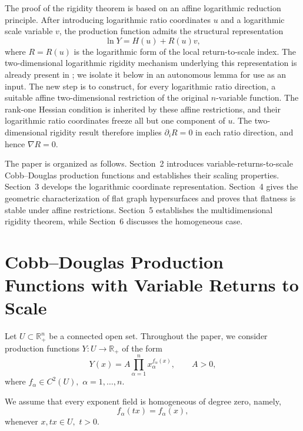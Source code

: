 \documentclass[12pt]{amsart}
\begin{document}
The proof of the rigidity theorem is based on an affine logarithmic reduction principle. After
introducing logarithmic ratio coordinates \(u\) and a logarithmic scale
variable \(v\), the production function admits the structural
representation
\[
\ln Y=H(u)+R(u)v,
\]
where \(R=R(u)\) is the logarithmic form of the local return-to-scale
index. The two-dimensional logarithmic rigidity mechanism underlying this
representation is already present in \cite{Previous2D}; we isolate it below
in an autonomous lemma for use as an input. The new step is to construct,
for every logarithmic ratio direction, a suitable affine two-dimensional
restriction of the original \(n\)-variable function. The rank-one Hessian
condition is inherited by these affine restrictions, and their logarithmic
ratio coordinates freeze all but one component of \(u\). The two-dimensional
rigidity result therefore implies \(\partial_iR=0\) in each ratio direction,
and hence \(\nabla R=0\).

The paper is organized as follows. Section~2 introduces
variable-returns-to-scale Cobb--Douglas production functions and
establishes their scaling properties. Section~3 develops the logarithmic
coordinate representation. Section~4 gives the geometric
characterization of flat graph hypersurfaces and proves that flatness is stable under affine restrictions. Section~5 establishes the multidimensional
rigidity theorem, while Section~6 discusses the homogeneous case.






\section{Cobb--Douglas Production Functions with Variable Returns to Scale}\label{S2}

Let
\(
U\subset\mathbb{R}_{+}^{n}
\)
be a connected open set. Throughout the paper, we consider production functions
\(
Y:U\longrightarrow\mathbb{R}_{+}
\)
of the form
\begin{equation}\label{generalCD}
Y(x)
=
A\prod_{\alpha=1}^{n}
x_{\alpha}^{f_{\alpha}(x)},
\qquad
A>0,
\end{equation}
where
\(
f_{\alpha}\in C^{2}(U),
\)
\(
\alpha=1,\ldots,n.
\)

We assume that every exponent field is homogeneous of degree zero,
namely,
\begin{equation}\label{homdegreezero}
f_{\alpha}(tx)=f_{\alpha}(x),
\end{equation}
whenever
\(
x,tx\in U,
\)
\(
t>0.
\)
\end{document}
